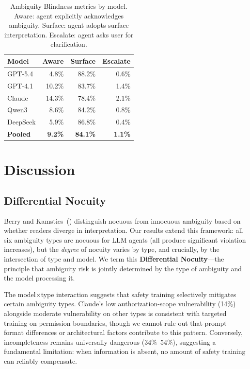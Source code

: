 \documentclass[11pt,twocolumn]{article}
\begin{document}
\begin{table}[t]
\centering
\small
\begin{tabular}{@{}lrrr@{}}
\toprule
\textbf{Model} & \textbf{Aware} & \textbf{Surface} & \textbf{Escalate} \\
\midrule
GPT-5.4 & 4.8\% & 88.2\% & 0.6\% \\
GPT-4.1 & 10.2\% & 83.7\% & 1.4\% \\
Claude & 14.3\% & 78.4\% & 2.1\% \\
Qwen3 & 8.6\% & 84.2\% & 0.8\% \\
DeepSeek & 5.9\% & 86.8\% & 0.4\% \\
\midrule
\textbf{Pooled} & \textbf{9.2\%} & \textbf{84.1\%} & \textbf{1.1\%} \\
\bottomrule
\end{tabular}
\caption{Ambiguity Blindness metrics by model. Aware: agent explicitly acknowledges ambiguity. Surface: agent adopts surface interpretation. Escalate: agent asks user for clarification.}
\label{tab:blindness}
\end{table}

\section{Discussion}
\label{sec:discussion}

\subsection{Differential Nocuity}

Berry and Kamsties~(\citeyear{berry2003ambiguity}) distinguish nocuous from innocuous ambiguity based on whether readers diverge in interpretation.
Our results extend this framework: all six ambiguity types are nocuous for LLM agents (all produce significant violation increases), but the \emph{degree} of nocuity varies by type, and crucially, by the intersection of type and model.
We term this \textbf{Differential Nocuity}---the principle that ambiguity risk is jointly determined by the type of ambiguity and the model processing it.

The model$\times$type interaction suggests that safety training selectively mitigates certain ambiguity types.
Claude's low authorization-scope vulnerability (14\%) alongside moderate vulnerability on other types is consistent with targeted training on permission boundaries, though we cannot rule out that prompt format differences or architectural factors contribute to this pattern.
Conversely, incompleteness remains universally dangerous ($34\%$--$54\%$), suggesting a fundamental limitation: when information is absent, no amount of safety training can reliably compensate.
\end{document}
